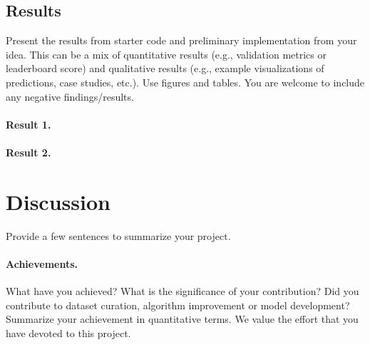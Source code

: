 \documentclass{article}
\begin{document}
\subsection{Results}
\label{sec:results}
Present the results from starter code and preliminary implementation from your idea. This can be a mix of quantitative results (e.g., validation metrics or leaderboard score) and qualitative results (e.g., example visualizations of predictions, case studies, etc.). Use figures and tables. You are welcome to include any negative findings/results.
\paragraph{Result 1.}
\paragraph{Result 2.}
% 
% 
\section{Discussion}
\label{sec:discussion}
Provide a few sentences to summarize your project. 

\paragraph{Achievements.}
What have you achieved? What is the significance of your contribution? Did you contribute to dataset curation, algorithm improvement or model development?  Summarize your achievement in quantitative terms. We value the effort that you have devoted to this project.



\end{document}
